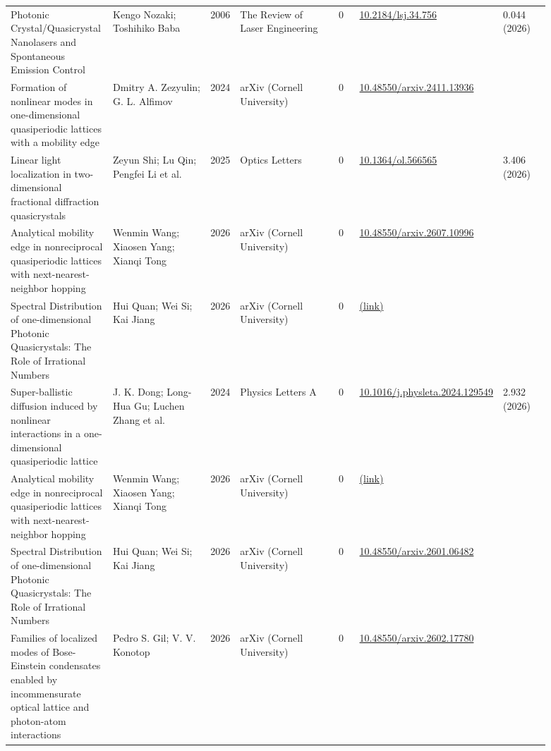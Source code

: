 \documentclass[10pt,a4paper]{article}
\begin{document}
{\begin{longtable}{p{0.192\linewidth}p{0.192\linewidth}p{0.043\linewidth}p{0.192\linewidth}p{0.043\linewidth}p{0.132\linewidth}p{0.096\linewidth}}
Photonic Crystal/Quasicrystal Nanolasers and Spontaneous Emission Control & Kengo Nozaki; Toshihiko Baba & 2006 & The Review of Laser Engineering & 0 & \href{https://doi.org/10.2184/lsj.34.756}{10.2184/lsj.34.756} & 0.044 (2026) \\
Formation of nonlinear modes in one-dimensional quasiperiodic lattices with a mobility edge & Dmitry A. Zezyulin; G. L. Alfimov & 2024 & arXiv (Cornell University) & 0 & \href{https://doi.org/10.48550/arxiv.2411.13936}{10.48550/arxiv.2411.13936} &  \\
Linear light localization in two-dimensional fractional diffraction quasicrystals & Zeyun Shi; Lu Qin; Pengfei Li et al. & 2025 & Optics Letters & 0 & \href{https://doi.org/10.1364/ol.566565}{10.1364/ol.566565} & 3.406 (2026) \\
Analytical mobility edge in nonreciprocal quasiperiodic lattices with next-nearest-neighbor hopping & Wenmin Wang; Xiaosen Yang; Xianqi Tong & 2026 & arXiv (Cornell University) & 0 & \href{https://doi.org/10.48550/arxiv.2607.10996}{10.48550/arxiv.2607.10996} &  \\
Spectral Distribution of one-dimensional Photonic Quasicrystals: The Role of Irrational Numbers & Hui Quan; Wei Si; Kai Jiang & 2026 & arXiv (Cornell University) & 0 & \href{https://openalex.org/W7124117353}{(link)} &  \\
Super-ballistic diffusion induced by nonlinear interactions in a one-dimensional quasiperiodic lattice & J. K. Dong; Long-Hua Gu; Luchen Zhang et al. & 2024 & Physics Letters A & 0 & \href{https://doi.org/10.1016/j.physleta.2024.129549}{10.1016/j.physleta.2024.129549} & 2.932 (2026) \\
Analytical mobility edge in nonreciprocal quasiperiodic lattices with next-nearest-neighbor hopping & Wenmin Wang; Xiaosen Yang; Xianqi Tong & 2026 & arXiv (Cornell University) & 0 & \href{https://openalex.org/W7168433559}{(link)} &  \\
Spectral Distribution of one-dimensional Photonic Quasicrystals: The Role of Irrational Numbers & Hui Quan; Wei Si; Kai Jiang & 2026 & arXiv (Cornell University) & 0 & \href{https://doi.org/10.48550/arxiv.2601.06482}{10.48550/arxiv.2601.06482} &  \\
Families of localized modes of Bose-Einstein condensates enabled by incommensurate optical lattice and photon-atom interactions & Pedro S. Gil; V. V. Konotop & 2026 & arXiv (Cornell University) & 0 & \href{https://doi.org/10.48550/arxiv.2602.17780}{10.48550/arxiv.2602.17780} &  \\

\end{longtable}}
\end{document}
